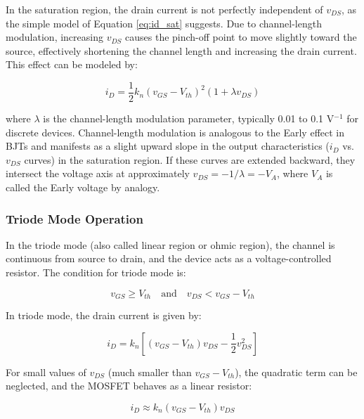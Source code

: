 \documentclass[10pt]{article}
\begin{document}
In the saturation region, the drain current is not perfectly independent of $v_{DS}$, as the simple model of Equation \ref{eq:id_sat} suggests. Due to channel-length modulation, increasing $v_{DS}$ causes the pinch-off point to move slightly toward the source, effectively shortening the channel length and increasing the drain current. This effect can be modeled by: 

\begin{equation}
    i_D = \frac{1}{2} k_n (v_{GS} - V_{th})^2 (1 + \lambda v_{DS})
    \label{eq:clm}
\end{equation}

where $\lambda$ is the channel-length modulation parameter, typically 0.01 to 0.1 V$^{-1}$ for discrete devices.  Channel-length modulation is analogous to the Early effect in BJTs and manifests as a slight upward slope in the output characteristics ($i_D$ vs.  $v_{DS}$ curves) in the saturation region.  If these curves are extended backward, they intersect the voltage axis at approximately $v_{DS} = -1/\lambda = -V_A$, where $V_A$ is called the Early voltage by analogy. 

\subsubsection{Triode Mode Operation}

In the triode mode (also called linear region or ohmic region), the channel is continuous from source to drain, and the device acts as a voltage-controlled resistor. The condition for triode mode is:

\begin{equation}
    v_{GS} \geq V_{th} \quad \text{and} \quad v_{DS} < v_{GS} - V_{th}
\end{equation}

In triode mode, the drain current is given by:

\begin{equation}
    i_D = k_n \left[ (v_{GS} - V_{th}) v_{DS} - \frac{1}{2} v_{DS}^2 \right]
    \label{eq:id_triode}
\end{equation}

For small values of $v_{DS}$ (much smaller than $v_{GS} - V_{th}$), the quadratic term can be neglected, and the MOSFET behaves as a linear resistor:

\begin{equation}
    i_D \approx k_n (v_{GS} - V_{th}) v_{DS}
\end{equation}
\end{document}
